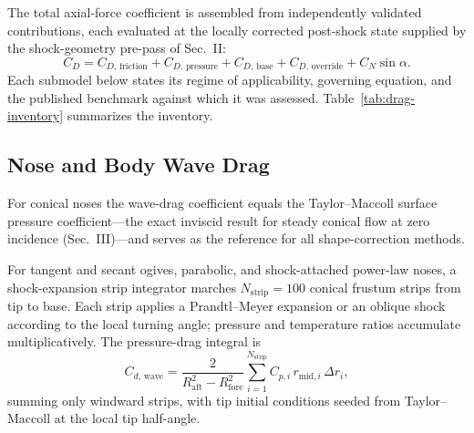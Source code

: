 
The total axial-force coefficient is assembled from independently validated
contributions, each evaluated at the locally corrected post-shock state supplied
by the shock-geometry pre-pass of Sec.~II:
%
\begin{equation}
C_D = C_{D,\,\mathrm{friction}} + C_{D,\,\mathrm{pressure}}
    + C_{D,\,\mathrm{base}} + C_{D,\,\mathrm{override}}
    + C_N \sin\alpha .
\label{eq:cd-total}
\end{equation}
%
Each submodel below states its regime of applicability, governing equation, and
the published benchmark against which it was assessed. Table~\ref{tab:drag-inventory}
summarizes the inventory.

\subsection{Nose and Body Wave Drag}

For conical noses the wave-drag coefficient equals the Taylor--Maccoll surface
pressure coefficient---the exact inviscid result for steady conical flow at zero
incidence (Sec.~III)---and serves as the reference for all shape-correction
methods.

For tangent and secant ogives, parabolic, and shock-attached power-law noses, a
shock-expansion strip integrator marches $N_{\mathrm{strip}} = 100$ conical
frustum strips from tip to base. Each strip applies a Prandtl--Meyer expansion or
an oblique shock according to the local turning angle; pressure and temperature
ratios accumulate multiplicatively. The pressure-drag integral is
%
\begin{equation}
C_{d,\,\mathrm{wave}} = \frac{2}{R_{\mathrm{aft}}^2 - R_{\mathrm{fore}}^2}
   \sum_{i=1}^{N_{\mathrm{strip}}} C_{p,i}\,r_{\mathrm{mid},i}\,\Delta r_i ,
\label{eq:strip-wave}
\end{equation}
%
summing only windward strips, with tip initial conditions seeded from
Taylor--Maccoll at the local tip half-angle.

